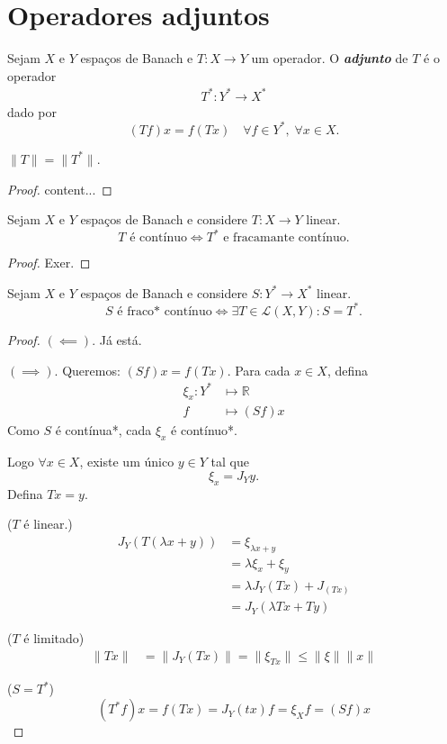 \documentclass[portuguese]{article}
\theoremstyle{definition}
\newcommand{\R}{\mathbb{R}}
\begin{document}
\section{Operadores adjuntos}
\begin{defn}
	Sejam $X$ e $Y$ espaços de Banach e $T:X\to Y$ um operador. O \textbf{\textit{adjunto}} de $T$ é o operador
	\begin{align*}
		T^*:Y^*\to X^*
	\end{align*}
	dado por
	\[(Tf)x=f(Tx)\quad\forall f\in Y^*,\;\forall x\in X.\]
\end{defn}
\begin{exer*}
	{\color{orange}$\|T\|=\|T^*\|$.}
\end{exer*}
\begin{proof}
	content...
\end{proof}
\begin{prop}
	Sejam $X$ e $Y$ espaços de Banach e considere $T:X\to Y$ linear.
	\[T\text{ é contínuo}\iff T^*\text{ e fracamante contínuo}.\]
\end{prop}
\begin{proof}
	{\color{orange}Exer.}
\end{proof}
\begin{prop}
	Sejam $X$ e $Y$ espaços de Banach e considere $S:Y^*\to X^*$ linear.
	\[S\text{ é fraco* contínuo}\iff\exists T\in\mathcal{L}(X,Y):S=T^*.\]
\end{prop}
\begin{proof}
	$(\impliedby)$. Já está.
	
	$(\implies)$. Queremos: $(Sf)x=f(Tx)$. Para cada $x\in X$, defina
	\begin{align*}
		\xi_x:Y^*&\mapsto \R\\
		f&\mapsto (Sf)x
	\end{align*}
	Como $S$ é contínua*, cada $\xi_x$ é contínuo*.
	
	Logo $\forall x\in X$, existe um único $y\in Y$ tal que
	\[\xi_x=J_Yy.\]
	Defina $Tx=y$.
	
	($T$ é linear.)\begin{align*}
		J_Y(T(\lambda x+y))&=\xi_{\lambda x+y}\\
		&=\lambda\xi_x+\xi_y\\
		&=\lambda J_Y(Tx)+J_(Tx)\\
		&=J_Y(\lambda Tx+Ty)
	\end{align*}
	
	($T$ é limitado)\begin{align*}
		\|Tx\|&=\|J_Y(Tx)\|=\|\xi_{Tx}\|\leq\|\xi\|\|x\|
	\end{align*}
	
	($S=T^*$) \[(T^*f)x=f(Tx)=J_Y(tx)f=\xi_Xf=(Sf)x\]
\end{proof}
\end{document}
